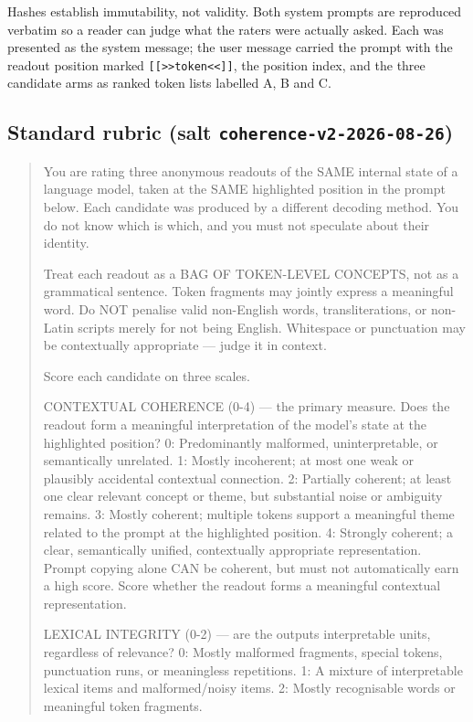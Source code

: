 \documentclass[11pt]{article}
\begin{document}
Hashes establish immutability, not validity. Both system prompts are reproduced
verbatim so a reader can judge what the raters were actually asked. Each was
presented as the system message; the user message carried the prompt with the
readout position marked \texttt{[[>>token<<]]}, the position index, and the three
candidate arms as ranked token lists labelled A, B and C.

\subsection*{Standard rubric (salt \texttt{coherence-v2-2026-08-26})}
\begin{quote}\ttfamily\scriptsize\raggedright
You are rating three anonymous readouts of the SAME internal state of a
language model, taken at the SAME highlighted position in the prompt below. Each
candidate was produced by a different decoding method. You do not know which is which,
and you must not speculate about their identity.

Treat each readout as a BAG OF TOKEN-LEVEL CONCEPTS, not as a grammatical sentence.
Token fragments may jointly express a meaningful word. Do NOT penalise valid
non-English words, transliterations, or non-Latin scripts merely for not being English.
Whitespace or punctuation may be contextually appropriate — judge it in context.

Score each candidate on three scales.

CONTEXTUAL COHERENCE (0-4) — the primary measure. Does the readout form a meaningful
interpretation of the model's state at the highlighted position?
  0: Predominantly malformed, uninterpretable, or semantically unrelated.
  1: Mostly incoherent; at most one weak or plausibly accidental contextual connection.
  2: Partially coherent; at least one clear relevant concept or theme, but substantial
     noise or ambiguity remains.
  3: Mostly coherent; multiple tokens support a meaningful theme related to the prompt
     at the highlighted position.
  4: Strongly coherent; a clear, semantically unified, contextually appropriate
     representation.
Prompt copying alone CAN be coherent, but must not automatically earn a high score.
Score whether the readout forms a meaningful contextual representation.

LEXICAL INTEGRITY (0-2) — are the outputs interpretable units, regardless of relevance?
  0: Mostly malformed fragments, special tokens, punctuation runs, or meaningless
     repetitions.
  1: A mixture of interpretable lexical items and malformed/noisy items.
  2: Mostly recognisable words or meaningful token fragments.


\end{quote}
\end{document}

